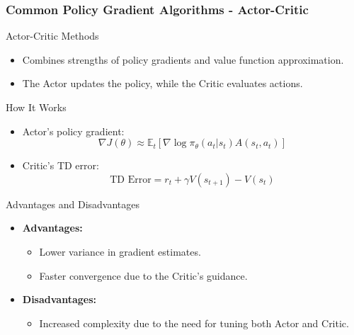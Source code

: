 \documentclass[aspectratio=169]{beamer}
\begin{document}
\begin{frame}[fragile]
    \frametitle{Common Policy Gradient Algorithms - Actor-Critic}
    \begin{block}{Actor-Critic Methods}
        \begin{itemize}
            \item Combines strengths of policy gradients and value function approximation.
            \item The Actor updates the policy, while the Critic evaluates actions.
        \end{itemize}
    \end{block}

    \begin{block}{How It Works}
        \begin{itemize}
            \item Actor's policy gradient:
            \begin{equation}
                \nabla J(\theta) \approx \mathbb{E}_{t} \left[ \nabla \log \pi_\theta(a_t | s_t) A(s_t, a_t) \right]
            \end{equation}
            \item Critic's TD error:
            \begin{equation}
                \text{TD Error} = r_t + \gamma V(s_{t+1}) - V(s_t)
            \end{equation}
        \end{itemize}
    \end{block}

    \begin{block}{Advantages and Disadvantages}
        \begin{itemize}
            \item \textbf{Advantages:}
                \begin{itemize}
                    \item Lower variance in gradient estimates.
                    \item Faster convergence due to the Critic's guidance.
                \end{itemize}
            \item \textbf{Disadvantages:}
                \begin{itemize}
                    \item Increased complexity due to the need for tuning both Actor and Critic.
                \end{itemize}
        \end{itemize}
    \end{block}
\end{frame}
\end{document}

